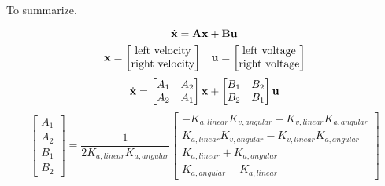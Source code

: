 To summarize,
\begin{theorem}
  \begin{equation*}
    \dot{\mathbf{x}} = \mathbf{A}\mathbf{x} + \mathbf{B}\mathbf{u}
  \end{equation*}
  \begin{equation*}
    \begin{array}{cc}
    \mathbf{x} =
      \begin{bmatrix}
        \text{left velocity} \\
        \text{right velocity}
      \end{bmatrix} &
    \mathbf{u} =
      \begin{bmatrix}
        \text{left voltage} \\
        \text{right voltage}
      \end{bmatrix}
    \end{array}
  \end{equation*}
  \begin{equation*}
    \dot{\mathbf{x}} =
      \begin{bmatrix}
        A_1 & A_2 \\
        A_2 & A_1
      \end{bmatrix} \mathbf{x} +
      \begin{bmatrix}
        B_1 & B_2 \\
        B_2 & B_1
      \end{bmatrix} \mathbf{u}
  \end{equation*}
  \begin{equation}
    \begin{bmatrix}
      A_1 \\
      A_2 \\
      B_1 \\
      B_2
    \end{bmatrix} = \frac{1}{2 K_{a,linear} K_{a,angular}}
      \begin{bmatrix}
        -K_{a,linear} K_{v,angular} - K_{v,linear} K_{a,angular} \\
        K_{a,linear} K_{v,angular} - K_{v,linear} K_{a,angular} \\
        K_{a,linear} + K_{a,angular} \\
        K_{a,angular} - K_{a,linear}
      \end{bmatrix}
  \end{equation}
\end{theorem}

